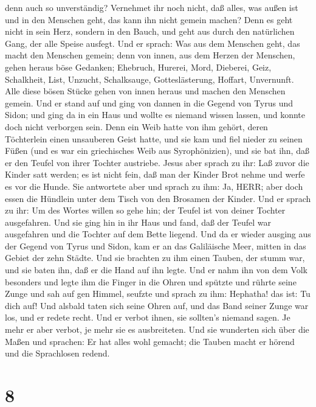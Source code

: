 denn auch so unverständig? Vernehmet ihr noch nicht, daß alles, was
außen ist und in den Menschen geht, das kann ihn nicht gemein machen?
 Denn es geht nicht in sein Herz, sondern in den Bauch, und
geht aus durch den natürlichen Gang, der alle Speise ausfegt.
 Und er sprach: Was aus dem Menschen geht, das macht den
Menschen gemein;  denn von innen, aus dem Herzen der
Menschen, gehen heraus böse Gedanken; Ehebruch, Hurerei, Mord,
 Dieberei, Geiz, Schalkheit, List, Unzucht, Schalksauge,
Gotteslästerung, Hoffart, Unvernunft.  Alle diese bösen
Stücke gehen von innen heraus und machen den Menschen gemein.
 Und er stand auf und ging von dannen in die Gegend von
Tyrus und Sidon; und ging da in ein Haus und wollte es niemand wissen
lassen, und konnte doch nicht verborgen sein.  Denn ein
Weib hatte von ihm gehört, deren Töchterlein einen unsauberen Geist
hatte, und sie kam und fiel nieder zu seinen Füßen  (und es
war ein griechisches Weib aus Syrophönizien), und sie bat ihn, daß er
den Teufel von ihrer Tochter austriebe.  Jesus aber sprach
zu ihr: Laß zuvor die Kinder satt werden; es ist nicht fein, daß man der
Kinder Brot nehme und werfe es vor die Hunde.  Sie
antwortete aber und sprach zu ihm: Ja, HERR; aber doch essen die
Hündlein unter dem Tisch von den Brosamen der Kinder.  Und
er sprach zu ihr: Um des Wortes willen so gehe hin; der Teufel ist von
deiner Tochter ausgefahren.  Und sie ging hin in ihr Haus
und fand, daß der Teufel war ausgefahren und die Tochter auf dem Bette
liegend.  Und da er wieder ausging aus der Gegend von Tyrus
und Sidon, kam er an das Galiläische Meer, mitten in das Gebiet der zehn
Städte.  Und sie brachten zu ihm einen Tauben, der stumm
war, und sie baten ihn, daß er die Hand auf ihn legte.  Und
er nahm ihn von dem Volk besonders und legte ihm die Finger in die Ohren
und spützte und rührte seine Zunge  und sah auf gen Himmel,
seufzte und sprach zu ihm: Hephatha! das ist: Tu dich auf! 
Und alsbald taten sich seine Ohren auf, und das Band seiner Zunge war
los, und er redete recht.  Und er verbot ihnen, sie
sollten's niemand sagen. Je mehr er aber verbot, je mehr sie es
ausbreiteten.  Und sie wunderten sich über die Maßen und
sprachen: Er hat alles wohl gemacht; die Tauben macht er hörend und die
Sprachlosen redend.

\hypertarget{section-7}{%
\section{8}\label{section-7}}

